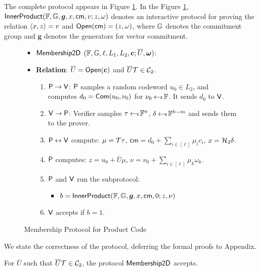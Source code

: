 The complete protocol appears in Figure \ref{fig:protocol1}. In the
Figure \ref{fig:protocol1}, $\mathsf{InnerProduct}(\mathbb{F},\mathbb{G},\bm{g},x,\mathsf{cm},v;z,\omega)$ denotes 
an interactive protocol for proving the relation $\langle x,z\rangle=v$ and 
$\mathsf{Open}(\mathsf{cm})=(z,\omega)$, where $\mathbb{G}$ denotes the commitment group and 
$\bm{g}$ denotes the generators for vector commitment. 
\begin{figure}[ht]
\begin{framed}
\begin{itemize}
\item {$\mathsf{Membership2D}$} $(\mathbb{F},\mathbb{G}, \ell, L_1, L_2,\mathbf{c}; \overline{U},\bm{\omega})$:
\item {\bf Relation}: $\overline{U}=\mathsf{Open}(\mathbf{c})$ and $\overline{U}\mathcal{T}\in \mathcal{C}_2$.
\begin{enumerate}[{\rm 1.}]
\item $\mathsf{P}\rightarrow\mathsf{V}$: $\mathsf{P}$ samples a random codeword $u_0\in
L_2$, and computes $d_0=\mathsf{Com}(u_0,\nu_0)$ for $\nu_0\hskip2.3pt{\gets\!\!\mbox{\tiny${\$}$\normalsize}}\, \mathbb{F}$. It sends $d_0$ to $\mathsf{V}$.
\item $\mathsf{V}\rightarrow \mathsf{P}$: Verifier samples $\tau\hskip2.3pt{\gets\!\!\mbox{\tiny${\$}$\normalsize}}\,
\mathbb{F}^n$, $\delta\hskip2.3pt{\gets\!\!\mbox{\tiny${\$}$\normalsize}}\, \mathbb{F}^{h-m}$ and sends them to the prover.
\item $\mathsf{P}\leftrightarrow \mathsf{V}$ compute: $\mu=\mathcal{T}\tau$,
$\mathsf{cm} = d_0+\sum_{i\in [\ell]} \mu_ic_i$, $x=\mathcal{H}_2\delta$.
\item $\mathsf{P}$ computes: $z=u_0+\overline{U}\mu$, $\nu=\nu_0+\sum_{i\in [\ell]}\mu_k\omega_k$.
\item $\mathsf{P}$ and $\mathsf{V}$ run the subprotocol:
	\begin{itemize}
	\item $b=\mathsf{InnerProduct}(\mathbb{F},\mathbb{G},\bm{g},x,\mathsf{cm},0;z,\nu)$
	\end{itemize}
\item $\mathsf{V}$ accepts if $b=1$.
\end{enumerate}
\end{itemize}
\end{framed}
\caption{Membership Protocol for Product Code}
\label{fig:protocol1}
\end{figure}

We state the correctness of the protocol, deferring the formal proofs to
Appendix.  
\begin{lemma}[Completeness]\label{lem:proximity2d_complete}
For $\overline{U}$ such that $\overline{U}\mathcal{T}\in \mathcal{C}_2$, the protocol $\mathsf{Membership2D}$ accepts.
\end{lemma}


